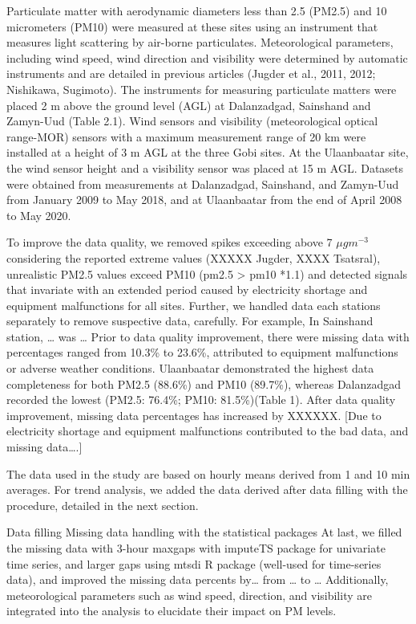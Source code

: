 \documentclass[
  11pt,
]{article}
\begin{document}
Particulate matter with aerodynamic diameters less than 2.5 (PM2.5) and
10 micrometers (PM10) were measured at these sites using an instrument
that measures light scattering by air-borne particulates. Meteorological
parameters, including wind speed, wind direction and visibility were
determined by automatic instruments and are detailed in previous
articles (Jugder et al., 2011, 2012; Nishikawa, Sugimoto). The
instruments for measuring particulate matters were placed 2 m above the
ground level (AGL) at Dalanzadgad, Sainshand and Zamyn-Uud (Table 2.1).
Wind sensors and visibility (meteorological optical range-MOR) sensors
with a maximum measurement range of 20 km were installed at a height of
3 m AGL at the three Gobi sites. At the Ulaanbaatar site, the wind
sensor height and a visibility sensor was placed at 15 m AGL. Datasets
were obtained from measurements at Dalanzadgad, Sainshand, and Zamyn-Uud
from January 2009 to May 2018, and at Ulaanbaatar from the end of April
2008 to May 2020.

To improve the data quality, we removed spikes exceeding above 7
\(\mu g m^{-3}\) considering the reported extreme values (XXXXX Jugder,
XXXX Tsatsral), unrealistic PM2.5 values exceed PM10 (pm2.5
\textgreater{} pm10 *1.1) and detected signals that invariate with an
extended period caused by electricity shortage and equipment
malfunctions for all sites. Further, we handled data each stations
separately to remove suspective data, carefully. For example, In
Sainshand station, \ldots{} was \ldots{} Prior to data quality
improvement, there were missing data with percentages ranged from 10.3\%
to 23.6\%, attributed to equipment malfunctions or adverse weather
conditions. Ulaanbaatar demonstrated the highest data completeness for
both PM2.5 (88.6\%) and PM10 (89.7\%), whereas Dalanzadgad recorded the
lowest (PM2.5: 76.4\%; PM10: 81.5\%)(Table 1). After data quality
improvement, missing data percentages has increased by XXXXXX. {[}Due to
electricity shortage and equipment malfunctions contributed to the bad
data, and missing data\ldots.{]}

The data used in the study are based on hourly means derived from 1 and
10 min averages. For trend analysis, we added the data derived after
data filling with the procedure, detailed in the next section.

Data filling Missing data handling with the statistical packages At
last, we filled the missing data with 3-hour maxgaps with imputeTS
package for univariate time series, and larger gaps using mtsdi R
package (well-used for time-series data), and improved the missing data
percents by\ldots{} from \ldots{} to \ldots{} Additionally,
meteorological parameters such as wind speed, direction, and visibility
are integrated into the analysis to elucidate their impact on PM levels.
\end{document}
